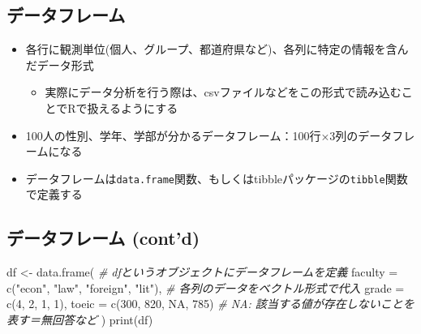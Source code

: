 \documentclass[
]{ltjsarticle}
\newenvironment{Shaded}{\begin{snugshade}}{\end{snugshade}}
\newcommand{\AttributeTok}[1]{\textcolor[rgb]{0.77,0.63,0.00}{#1}}
\newcommand{\CommentTok}[1]{\textcolor[rgb]{0.56,0.35,0.01}{\textit{#1}}}
\newcommand{\ConstantTok}[1]{\textcolor[rgb]{0.00,0.00,0.00}{#1}}
\newcommand{\DecValTok}[1]{\textcolor[rgb]{0.00,0.00,0.81}{#1}}
\newcommand{\FunctionTok}[1]{\textcolor[rgb]{0.00,0.00,0.00}{#1}}
\newcommand{\NormalTok}[1]{#1}
\newcommand{\OtherTok}[1]{\textcolor[rgb]{0.56,0.35,0.01}{#1}}
\newcommand{\StringTok}[1]{\textcolor[rgb]{0.31,0.60,0.02}{#1}}
\providecommand{\tightlist}{%
  \setlength{\itemsep}{0pt}\setlength{\parskip}{0pt}}
\begin{document}
\hypertarget{ux30c7ux30fcux30bfux30d5ux30ecux30fcux30e0}{%
\subsection{データフレーム}\label{ux30c7ux30fcux30bfux30d5ux30ecux30fcux30e0}}

\begin{itemize}
\item
  各行に観測単位(個人、グループ、都道府県など)、各列に特定の情報を含んだデータ形式

  \begin{itemize}
  \tightlist
  \item
    実際にデータ分析を行う際は、csvファイルなどをこの形式で読み込むことでRで扱えるようにする
  \end{itemize}
\item
  100人の性別、学年、学部が分かるデータフレーム：100行×3列のデータフレームになる
\item
  データフレームは\texttt{data.frame}関数、もしくはtibbleパッケージの\texttt{tibble}関数で定義する
\end{itemize}

\hypertarget{ux30c7ux30fcux30bfux30d5ux30ecux30fcux30e0-contd}{%
\subsection{データフレーム
(cont'd)}\label{ux30c7ux30fcux30bfux30d5ux30ecux30fcux30e0-contd}}

\begin{Shaded}
\begin{Highlighting}[]
\NormalTok{df }\OtherTok{\textless{}{-}} \FunctionTok{data.frame}\NormalTok{( }\CommentTok{\# dfというオブジェクトにデータフレームを定義}
  \AttributeTok{faculty =} \FunctionTok{c}\NormalTok{(}\StringTok{"econ"}\NormalTok{, }\StringTok{"law"}\NormalTok{, }\StringTok{"foreign"}\NormalTok{, }\StringTok{"lit"}\NormalTok{), }\CommentTok{\# 各列のデータをベクトル形式で代入}
  \AttributeTok{grade =} \FunctionTok{c}\NormalTok{(}\DecValTok{4}\NormalTok{, }\DecValTok{2}\NormalTok{, }\DecValTok{1}\NormalTok{, }\DecValTok{1}\NormalTok{),}
  \AttributeTok{toeic =} \FunctionTok{c}\NormalTok{(}\DecValTok{300}\NormalTok{, }\DecValTok{820}\NormalTok{, }\ConstantTok{NA}\NormalTok{, }\DecValTok{785}\NormalTok{) }\CommentTok{\# NA: 該当する値が存在しないことを表す＝無回答など}
\NormalTok{)}
\FunctionTok{print}\NormalTok{(df)}
\end{Highlighting}
\end{Shaded}
\end{document}
